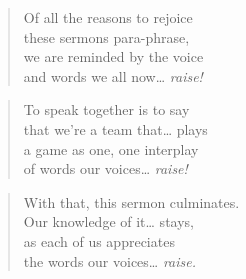 \documentclass[10pt,a4paper]{article}
\begin{document}
\begin{multicols}{2}
\begin{verse}
Of all the reasons to rejoice\\
these sermons para-phrase,\\
we are reminded by the voice\\
and words we all now… \emph{raise!}
\end{verse}

\begin{verse}
To speak together is to say\\
that we’re a team that… plays\\
a game as one, one interplay\\
of words our voices… \emph{raise!}
\end{verse}

\begin{verse}
With that, this sermon culminates.\\
Our knowledge of it… stays,\\
as each of us appreciates\\
the words our voices… \emph{raise.}
\end{verse}

\end{multicols}
\end{document}
